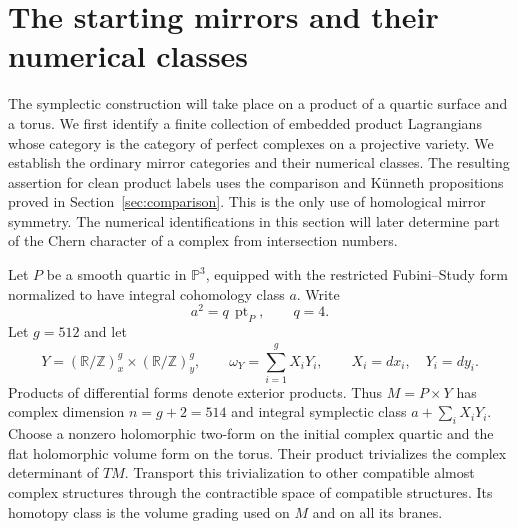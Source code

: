 \documentclass[11pt]{article}
\numberwithin{equation}{section}
\theoremstyle{definition}
\theoremstyle{remark}
\newcommand{\R}{\mathbb R}
\newcommand{\Z}{\mathbb Z}
\newcommand{\pt}{\operatorname{pt}}
\begin{document}
\section{The starting mirrors and their numerical classes}\label{sec:mirror}

The symplectic construction will take place on a product of a quartic surface
and a torus.  We first identify a finite collection of embedded product
Lagrangians whose category is the category of perfect complexes on a projective
variety.  We establish the ordinary mirror categories and their
numerical classes.  The resulting assertion for clean product labels
uses the comparison and K\"unneth propositions proved in
Section~\ref{sec:comparison}.  This is the only use of homological mirror symmetry.  The numerical
identifications in this section will later determine part of the Chern character
of a complex from intersection numbers.

Let $P$ be a smooth quartic in $\mathbb P^3$, equipped with the restricted
Fubini--Study form normalized to have integral cohomology class $a$.  Write
\begin{equation}\label{eq:quartic-normalization}
 a^2=q\,\pt_P,\qquad q=4.
\end{equation}
Let $g=512$ and let
\[
 Y=(\R/\Z)^g_x\times(\R/\Z)^g_y,\qquad
 \omega_Y=\sum_{i=1}^g X_iY_i,
 \qquad X_i=dx_i,\quad Y_i=dy_i.
\]
Products of differential forms denote exterior products.  Thus
$M=P\times Y$ has complex dimension $n=g+2=514$ and integral symplectic
class $a+\sum_iX_iY_i$.
Choose a nonzero holomorphic two-form on the initial complex quartic
and the flat holomorphic volume form on the torus.  Their product
trivializes the complex determinant of $TM$.  Transport this
trivialization to other compatible almost complex structures through
the contractible space of compatible structures.  Its homotopy
class is the volume grading used on $M$ and on all its branes.
\end{document}
